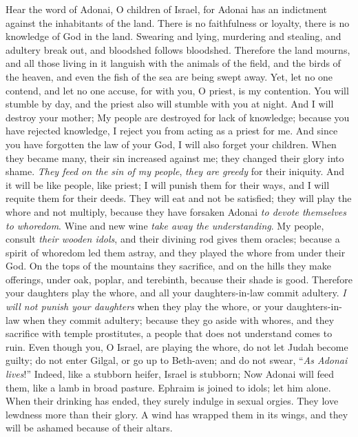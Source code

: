 \begin{biblechapter} %
 Hear the word of Adonai, O children of Israel, 
for Adonai has an indictment against the inhabitants of the land. 
There is no faithfulness or loyalty, 
there is no knowledge of God in the land.
\verse Swearing and lying, 
murdering and stealing, 
and adultery break out, 
and bloodshed follows bloodshed.
\verse Therefore the land mourns, 
and all those living in it languish 
with the animals of the field, 
and the birds of the heaven, 
and even the fish of the sea 
are being swept away.
\verse Yet, let no one contend, 
and let no one accuse, 
for with you, O priest, is my contention.
\verse You will stumble by day, 
and the priest also will stumble 
with you at night. 
And I will destroy your mother;
\verse My people are destroyed 
for lack of knowledge; 
because you have rejected knowledge, 
I reject you from acting as a priest for me. 
And since you have forgotten the law of your God, 
I will also forget your children.
\verse When they became many, their sin increased against me; 
they changed their glory into shame.
\verse \textit{They feed on the sin of my people}, 
\textit{they are greedy} for their iniquity.
\verse And it will be like people, like priest; 
I will punish them for their ways, 
and I will requite them for their deeds.
\verse They will eat and not be satisfied; 
they will play the whore and not multiply, 
because they have forsaken Adonai \textit{to devote themselves to
\verse whoredom}. 
Wine and new wine \textit{take away the understanding}.
\verse My people, 
consult \textit{their wooden idols}, 
and their divining rod gives them oracles; 
because a spirit of whoredom led them astray, 
and they played the whore from under their God.
\verse On the tops of the mountains they sacrifice, 
and on the hills they make offerings, 
under oak, poplar, and terebinth, 
because their shade is good. 
Therefore your daughters play the whore, 
and all your daughters-in-law commit adultery.
\verse \textit{I will not punish your daughters} when they play the whore, 
or your daughters-in-law when they commit adultery; 
because they go aside with whores, 
and they sacrifice with temple prostitutes, 
a people that does not understand comes to ruin.
\verse Even though you, O Israel, are playing the whore, 
do not let Judah become guilty; 
do not enter Gilgal, 
or go up to Beth-aven; 
and do not swear, 
“\textit{As Adonai lives}!”
\verse Indeed, like a stubborn heifer, 
Israel is stubborn; 
Now Adonai will feed them, 
like a lamb in broad pasture.
\verse Ephraim is joined to idols; 
let him alone.
\verse When their drinking has ended, 
they surely indulge in sexual orgies. 
They love lewdness more than their glory.
\verse A wind has wrapped them in its wings, 
and they will be ashamed because of their altars.
\end{biblechapter}

